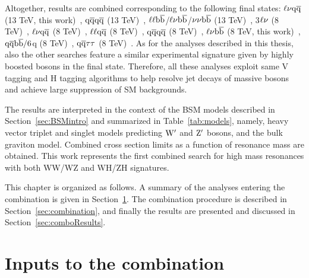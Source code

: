 Altogether, results are combined corresponding to the following final states: $\ell \nu \mathrm{q}\overline{\mathrm{q}}$ (13 TeV, this work)~\cite{CMS-PAS-EXO-15-002}, $\mathrm{q}\overline{\mathrm{q}} \mathrm{q}\overline{\mathrm{q}}$ (13 TeV)~\cite{CMS-PAS-EXO-15-002},
$\ell \ell {\mathrm{b}\overline{\mathrm{b}}}$/$\ell \nu {\mathrm{b}\overline{\mathrm{b}}}$/$\nu \nu {\mathrm{b}\overline{\mathrm{b}}}$ (13 TeV)~\cite{Khachatryan:2016cfx},
3$\ell\nu$ (8 TeV)~\cite{Khachatryan:2014xja}, 
$\ell \nu \mathrm{q}\overline{\mathrm{q}}$ (8 TeV)~\cite{Khachatryan:2014gha}, $\ell\ell \mathrm{q}\overline{\mathrm{q}}$ (8 TeV)~\cite{Khachatryan:2014gha}, 
$\mathrm{q}\overline{\mathrm{q}} \mathrm{q}\overline{\mathrm{q}}$ (8 TeV)~\cite{Khachatryan:2014hpa}, 
$\ell \nu {\mathrm{b}\overline{\mathrm{b}}}$ (8 TeV, this work)~\cite{Khachatryan:2016yji}, $\mathrm{q}\overline{\mathrm{q}}{\mathrm{b}\overline{\mathrm{b}}}/6$q (8 TeV)~\cite{Khachatryan:2015bma}, 
$\mathrm{q}\overline{\mathrm{q}} \tau\tau $ (8 TeV)~\cite{Khachatryan:2015ywa}.
As for the analyses described in this thesis, also the other searches feature a similar experimental signature given by highly boosted bosons in the final state.
Therefore, all these analyses exploit same V tagging and H tagging algorithms to help resolve jet decays of massive bosons and achieve large suppression of SM backgrounds.

The results are interpreted in the context of the BSM models described in Section~\ref{sec:BSMintro} and summarized in Table~\ref{tab:models}, namely, heavy vector triplet and singlet models predicting $\mathrm{W}^\prime$ and $\mathrm{Z}^\prime$ bosons, and the bulk graviton model.
Combined cross section limits as a function of resonance mass are obtained. This work represents the first combined search for high mass resonances with both WW/WZ and WH/ZH signatures.

This chapter is organized as follows.
A summary of the analyses entering the combination is given in Section~\ref{sec:analyses}.
The combination procedure is described in Section~\ref{sec:combination}, and finally the results are presented and discussed in Section~\ref{sec:comboResults}.

\section{Inputs to the combination}\label{sec:analyses}

